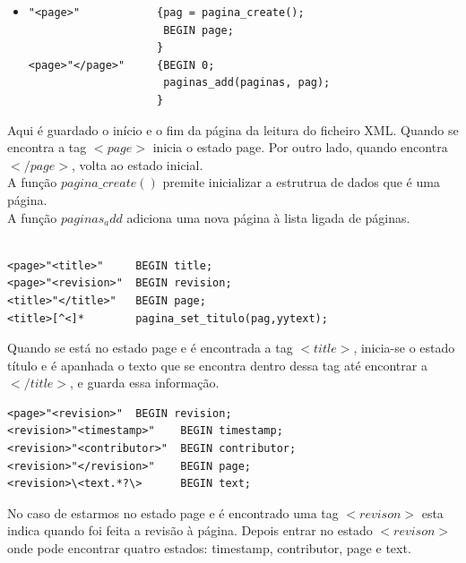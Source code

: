 \documentclass[11pt, a4paper, oneside]{article}
\begin{document}
\begin{itemize}
\item 
\begin{verbatim}
"<page>"            {pag = pagina_create();
                     BEGIN page;
                    }
<page>"</page>"     {BEGIN 0;
                     paginas_add(paginas, pag);
                    }
\end{verbatim}
\end{itemize}
Aqui é guardado o início e o fim da página da leitura do ficheiro XML. Quando se encontra a tag \begin{math}<page>\end{math} inicia o estado page. Por outro lado, quando encontra \begin{math}</page>\end{math}, volta ao estado inicial. 
\\A função \begin{math}pagina\_create()\end{math} premite inicializar a estrutrua de dados que é uma página.
\\ A função \begin{math}paginas_add\end{math} adiciona uma nova página à lista ligada de páginas.

\begin{verbatim}

<page>"<title>"     BEGIN title;
<page>"<revision>"  BEGIN revision;
<title>"</title>"   BEGIN page;
<title>[^<]*        pagina_set_titulo(pag,yytext);

\end{verbatim}

Quando se está no estado page e é encontrada a tag \begin{math}<title>\end{math}, inicia-se o estado título e é apanhada o texto que se encontra dentro dessa tag até encontrar a \begin{math}</title>\end{math}, e guarda essa informação.


\begin{verbatim}
<page>"<revision>"  BEGIN revision;
<revision>"<timestamp>"    BEGIN timestamp;
<revision>"<contributor>"  BEGIN contributor;
<revision>"</revision>"    BEGIN page;
<revision>\<text.*?\>      BEGIN text;
\end{verbatim}


No caso de estarmos no estado page e é encontrado uma tag \begin{math}<revison>\end{math} esta indica quando foi feita a revisão à página. Depois entrar no estado \begin{math}<revison>\end{math} onde pode encontrar quatro estados: timestamp, contributor, page e text.
\end{document}
